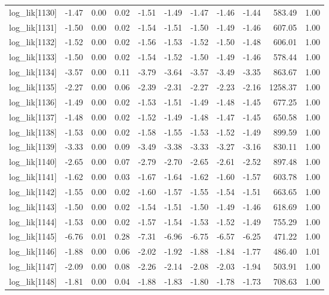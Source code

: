 \begin{table}[ht]
\begin{tabular}{rrrrrrrrrrr}
  log\_lik[1130] & -1.47 & 0.00 & 0.02 & -1.51 & -1.49 & -1.47 & -1.46 & -1.44 & 583.49 & 1.00 \\ 
  log\_lik[1131] & -1.50 & 0.00 & 0.02 & -1.54 & -1.51 & -1.50 & -1.49 & -1.46 & 607.05 & 1.00 \\ 
  log\_lik[1132] & -1.52 & 0.00 & 0.02 & -1.56 & -1.53 & -1.52 & -1.50 & -1.48 & 606.01 & 1.00 \\ 
  log\_lik[1133] & -1.50 & 0.00 & 0.02 & -1.54 & -1.52 & -1.50 & -1.49 & -1.46 & 578.44 & 1.00 \\ 
  log\_lik[1134] & -3.57 & 0.00 & 0.11 & -3.79 & -3.64 & -3.57 & -3.49 & -3.35 & 863.67 & 1.00 \\ 
  log\_lik[1135] & -2.27 & 0.00 & 0.06 & -2.39 & -2.31 & -2.27 & -2.23 & -2.16 & 1258.37 & 1.00 \\ 
  log\_lik[1136] & -1.49 & 0.00 & 0.02 & -1.53 & -1.51 & -1.49 & -1.48 & -1.45 & 677.25 & 1.00 \\ 
  log\_lik[1137] & -1.48 & 0.00 & 0.02 & -1.52 & -1.49 & -1.48 & -1.47 & -1.45 & 650.58 & 1.00 \\ 
  log\_lik[1138] & -1.53 & 0.00 & 0.02 & -1.58 & -1.55 & -1.53 & -1.52 & -1.49 & 899.59 & 1.00 \\ 
  log\_lik[1139] & -3.33 & 0.00 & 0.09 & -3.49 & -3.38 & -3.33 & -3.27 & -3.16 & 830.11 & 1.00 \\ 
  log\_lik[1140] & -2.65 & 0.00 & 0.07 & -2.79 & -2.70 & -2.65 & -2.61 & -2.52 & 897.48 & 1.00 \\ 
  log\_lik[1141] & -1.62 & 0.00 & 0.03 & -1.67 & -1.64 & -1.62 & -1.60 & -1.57 & 603.78 & 1.00 \\ 
  log\_lik[1142] & -1.55 & 0.00 & 0.02 & -1.60 & -1.57 & -1.55 & -1.54 & -1.51 & 663.65 & 1.00 \\ 
  log\_lik[1143] & -1.50 & 0.00 & 0.02 & -1.54 & -1.51 & -1.50 & -1.49 & -1.46 & 618.69 & 1.00 \\ 
  log\_lik[1144] & -1.53 & 0.00 & 0.02 & -1.57 & -1.54 & -1.53 & -1.52 & -1.49 & 755.29 & 1.00 \\ 
  log\_lik[1145] & -6.76 & 0.01 & 0.28 & -7.31 & -6.96 & -6.75 & -6.57 & -6.25 & 471.22 & 1.00 \\ 
  log\_lik[1146] & -1.88 & 0.00 & 0.06 & -2.02 & -1.92 & -1.88 & -1.84 & -1.77 & 486.40 & 1.01 \\ 
  log\_lik[1147] & -2.09 & 0.00 & 0.08 & -2.26 & -2.14 & -2.08 & -2.03 & -1.94 & 503.91 & 1.00 \\ 
  log\_lik[1148] & -1.81 & 0.00 & 0.04 & -1.88 & -1.83 & -1.80 & -1.78 & -1.73 & 708.63 & 1.00 \\ 

\end{tabular}
\end{table}
